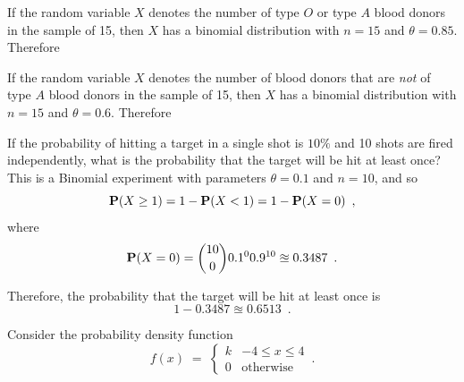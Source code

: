 \begin{ExerciseList}
\medskip
\item If the random variable $X$ denotes the number of type  $O$ or type $A$ blood donors
  in the sample of 15, then $X$ has a binomial distribution with $n=15$
  and $\theta=0.85$.  Therefore

\medskip
\item If the random variable $X$ denotes the number of blood donors that
  are \emph{not} of type $A$ blood donors
  in the sample of 15, then $X$ has a binomial distribution with $n=15$
  and $\theta=0.6$.  Therefore
\ee



\Exercise
If the probability of hitting a target in a single shot is $10\%$ and 10 shots are fired independently, what is the probability that the target will be hit at least once?
\Answer
This is a Binomial experiment with parameters $\theta=0.1$ and $n=10$, and so 
\[\mathbf{P}(X\geq 1) = 1-\mathbf{P}(X<1) = 1-\mathbf{P}(X=0) \enspace ,\] 
where
\[\mathbf{P}(X=0) = \binom{10}{0}0.1^0 0.9^{10} \approxeq 0.3487 \enspace .\]

 Therefore, the probability that the target will be hit at least once is
 \[1- 0.3487 \approxeq 0.6513 \enspace .\]

\Exercise
Consider the probability density function
$$f(x)\;=\;\begin{cases} k &-4 \leq x\leq4\\0&\textrm{otherwise}\end{cases}\,.$$


\end{ExerciseList}
